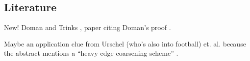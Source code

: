 \documentclass{article}
\begin{document}
\begin{enumerate}
\section{Literature}

New! Doman and Trinks \cite{DohmenTrinksAbsWitBrok}, paper citing
Doman's proof \cite{DohIndProofMatroids}.

Maybe an application clue from Urschel (who's also into football) et. al.
because the abstract mentions a ``heavy edge coarsening scheme''
\cite{UrschelFiedlerGraphLaplac}.

\end{enumerate}


\end{document}
